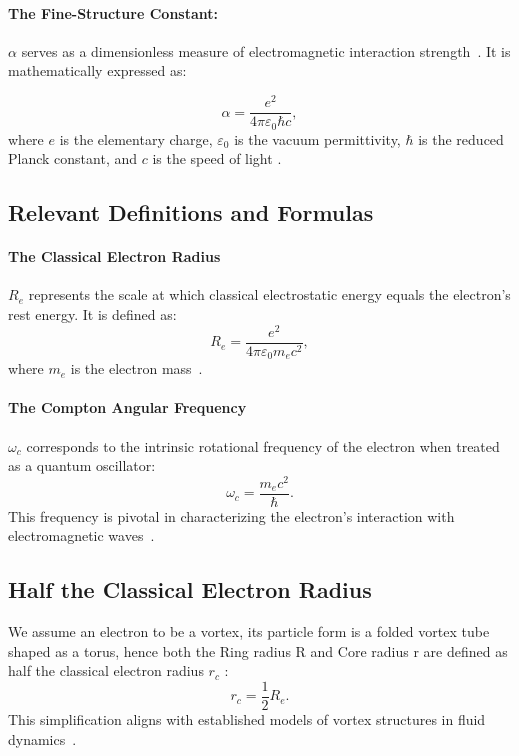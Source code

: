 \paragraph*{The Fine-Structure Constant:}
$\alpha$ serves as a dimensionless measure of electromagnetic interaction strength~\cite{maxwell1861}.
It is mathematically expressed as:

\begin{equation*}
    \alpha = \frac{e^2}{4\pi \varepsilon_0 \hbar c},
\end{equation*}
where $e$ is the elementary charge, $\varepsilon_0$ is the vacuum permittivity, $\hbar$ is the reduced Planck constant, and $c$ is the speed of light \cite{dirac1930quantum}.

\subsection*{Relevant Definitions and Formulas}
\paragraph*{The Classical Electron Radius}
$R_e$ represents the scale at which classical electrostatic energy equals the electron's rest energy. It is defined as:
\begin{equation*}
    R_e = \frac{e^2}{4\pi \varepsilon_0 m_e c^2},
\end{equation*}
where $m_e$ is the electron mass~\cite{helmholtz1858}.

\paragraph*{The Compton Angular Frequency}
$\omega_c$ corresponds to the intrinsic rotational frequency of the electron when treated as a quantum oscillator:
\begin{equation*}
    \omega_c = \frac{m_e c^2}{\hbar}.
\end{equation*}
This frequency is pivotal in characterizing the electron's interaction with electromagnetic waves~\cite{kelvin1867}.

\subsection*{Half the Classical Electron Radius}
We assume an electron to be a vortex, its particle form is a folded vortex tube shaped as a torus, hence both the Ring radius R and Core radius r are defined as half the classical electron radius  $r_c$ :
\begin{equation*}
    r_c = \frac{1}{2} R_e.
\end{equation*}
This simplification aligns with established models of vortex structures in fluid dynamics~\cite{kleckner2013}.

